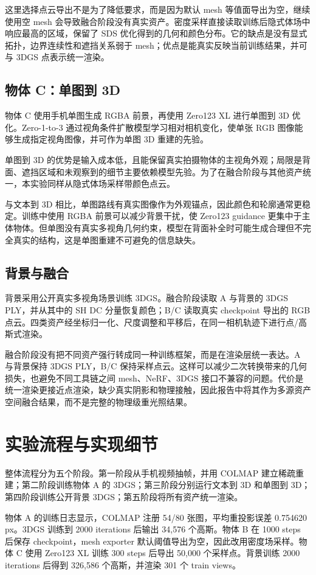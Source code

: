 \documentclass[10pt,twocolumn]{ctexart}
\begin{document}
这里选择点云导出不是为了降低要求，而是因为默认 mesh 等值面导出为空，继续使用空 mesh 会导致融合阶段没有真实资产。密度采样直接读取训练后隐式体场中响应最高的区域，保留了 SDS 优化得到的几何和颜色分布。它的缺点是没有显式拓扑，边界连续性和遮挡关系弱于 mesh；优点是能真实反映当前训练结果，并可与 3DGS 点表示统一渲染。

\subsection{物体 C：单图到 3D}
物体 C 使用手机单图生成 RGBA 前景，再使用 Zero123 XL 进行单图到 3D 优化。Zero-1-to-3 通过视角条件扩散模型学习相对相机变化，使单张 RGB 图像能够生成指定视角图像，并可作为单图 3D 重建的先验\cite{liu2023zero123}。

单图到 3D 的优势是输入成本低，且能保留真实拍摄物体的主视角外观；局限是背面、遮挡区域和未观察到的细节主要依赖模型先验。为了在融合阶段与其他资产统一，本实验同样从隐式体场采样带颜色点云。

与文本到 3D 相比，单图路线有真实图像作为外观锚点，因此颜色和轮廓通常更稳定。训练中使用 RGBA 前景可以减少背景干扰，使 Zero123 guidance 更集中于主体物体。但单图没有真实多视角几何约束，模型在背面补全时可能生成合理但不完全真实的结构，这是单图重建不可避免的信息缺失。

\subsection{背景与融合}
背景采用公开真实多视角场景训练 3DGS。融合阶段读取 A 与背景的 3DGS PLY，并从其中的 SH DC 分量恢复颜色；B/C 读取真实 checkpoint 导出的 RGB 点云。四类资产经坐标归一化、尺度调整和平移后，在同一相机轨迹下进行点/高斯式渲染。

融合阶段没有把不同资产强行转成同一种训练框架，而是在渲染层统一表达。A 与背景保持 3DGS PLY，B/C 保持采样点云。这样可以减少二次转换带来的几何损失，也避免不同工具链之间 mesh、NeRF、3DGS 接口不兼容的问题。代价是统一渲染更接近点渲染，缺少真实阴影和物理接触，因此报告中将其作为多源资产空间融合结果，而不是完整的物理级重光照结果。

\section{实验流程与实现细节}
整体流程分为五个阶段。第一阶段从手机视频抽帧，并用 COLMAP 建立稀疏重建；第二阶段训练物体 A 的 3DGS；第三阶段分别运行文本到 3D 和单图到 3D；第四阶段训练公开背景 3DGS；第五阶段将所有资产统一渲染。

物体 A 的训练日志显示，COLMAP 注册 54/80 张图，平均重投影误差 0.754620 px。3DGS 训练到 2000 iterations 后输出 34,576 个高斯。物体 B 在 1000 steps 后保存 checkpoint，mesh exporter 默认阈值导出为空，因此改用密度场采样。物体 C 使用 Zero123 XL 训练 300 steps 后导出 50,000 个采样点。背景训练 2000 iterations 后得到 326,586 个高斯，并渲染 301 个 train views。
\end{document}
